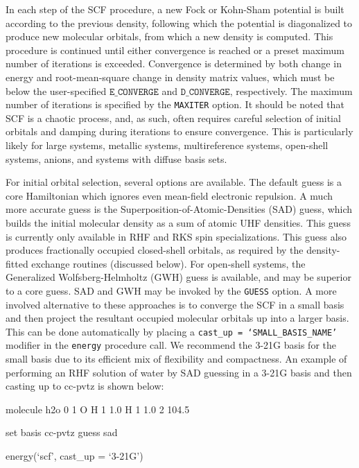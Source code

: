 In each step of the SCF procedure, a new Fock or Kohn-Sham potential is built
according to the previous density, following which the potential is diagonalized
to produce new molecular orbitals, from which a new density is computed. This
procedure is continued until either convergence is reached or a preset maximum
number of iterations is exceeded. Convergence is determined by both change in
energy and root-mean-square change in density matrix values, which must be below
the user-specified $\mathtt{E\_CONVERGE}$ and
$\mathtt{D\_CONVERGE}$, respectively. The maximum number of iterations is
specified by the \texttt{MAXITER} option. It should be noted that SCF is a
chaotic process, and, as such, often requires careful selection of initial
orbitals and damping during iterations to ensure convergence. This is
particularly likely for large systems, metallic systems, multireference systems,
open-shell systems, anions, and systems with diffuse basis sets. 

For initial orbital selection, several options are available. The default guess
is a core Hamiltonian which ignores even mean-field electronic repulsion. A much
more accurate guess is the Superposition-of-Atomic-Densities (SAD) guess, which
builds the initial molecular density as a sum of atomic UHF densities. This
guess is currently only available in RHF and RKS spin specializations. This
guess also produces fractionally occupied closed-shell orbitals, as required by
the density-fitted exchange routines (discussed below). For open-shell systems,
the Generalized Wolfsberg-Helmholtz (GWH) guess is available, and may be
superior to a core guess. SAD and GWH may be invoked by the \texttt{GUESS}
option. A more involved alternative to these approaches is to converge the SCF
in a small basis and then project the resultant occupied molecular orbitals up
into a larger basis. This can be done automatically by placing a
\texttt{cast\_up = `SMALL\_BASIS\_NAME'} modifier in the \texttt{energy}
procedure call. We recommend the 3-21G basis for the small basis due to its
efficient mix of flexibility and compactness. An example of performing an RHF
solution of water by SAD guessing in a 3-21G basis and then casting up to
cc-pvtz is shown below: 
\begin{Snippet}
molecule h2o {
0 1
O
H 1 1.0
H 1 1.0 2 104.5
}

set {
basis cc-pvtz 
guess sad
}

energy(`scf', cast_up = `3-21G')
\end{Snippet}

